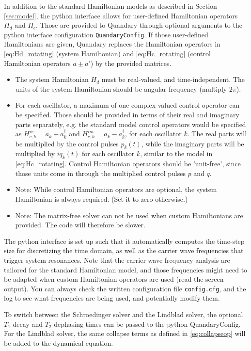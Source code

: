 \documentclass[11pt]{article}
\begin{document}
In addition to the standard Hamiltonian models as described in Section \ref{sec:model}, the python interface allows for user-defined Hamiltonian operators $H_d$ and $H_c$. Those are provided to Quandary through optional arguments to the python interface configuration \texttt{QuandaryConfig}. If those user-defined Hamiltonians are given, Quandary replaces the Hamiltonian operators in \eqref{eq:Hd_rotating} (system Hamiltonian) and \eqref{eq:Hc_rotating} (control Hamiltonian operators $a\pm a'$) by the provided matrices.
\begin{itemize}
  \item The system Hamiltonian $H_d$ must be real-valued, and time-independent. The units of the system Hamiltonian should be angular frequency (multiply $2\pi$). 
  \item For each oscillator, a maximum of one complex-valued control operator can be specified. Those should be provided in terms of their real and imaginary parts separately, e.g. the standard model control operators would be specified as $H_{c,k}^{re} = a_k+a_k^\dagger$ and $H_{c,k}^{im}=a_k-a_k^\dagger$, for each oscillator $k$. The real parts will be multiplied by the control pulses $p_k(t)$, while the imaginary parts will be multiplied by $iq_k(t)$ for each oscillator $k$, similar to the model in \eqref{eq:Hc_rotating}. Control Hamiltonian operators should be 'unit-free', since those units come in through the multiplied control pulses $p$ and $q$.
  \item Note: While control Hamiltonian operators are optional, the system Hamiltonian is always required. (Set it to zero otherwise.)
  \item Note: The matrix-free solver can not be used when custom Hamiltonians are provided. The code will therefore be slower. 
\end{itemize}

The python interface is set up such that it automatically computes the time-step size for discretizing the time domain, as well as the carrier wave frequencies that trigger system resonances. Note that the carrier wave frequency analysis are tailored for the standard Hamiltonian model, and those frequencies might need to be adapted when custom Hamiltonian operators are used (read the screen output). You can always check the written configuration file \texttt{config.cfg}, and the log to see what frequencies are being used, and potentially modify them. 

To switch between the Schroedinger solver and the Lindblad solver, the optional $T_1$ decay and $T_2$ dephasing times can be passed to the python QuandaryConfig. For the Lindblad solver, the same collapse terms as defined in \eqref{eq:collapseop} will be added to the dynamical equation. 
\end{document}
